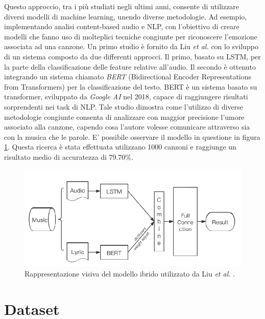 \documentclass[11pt]{report}
\begin{document}
 Questo approccio, tra i più studiati negli ultimi anni, consente di utilizzare diversi modelli di machine learning, unendo diverse metodologie. Ad esempio, implementando analisi content-based audio e NLP, con l'obiettivo di creare modelli che fanno uso di molteplici tecniche congiunte per riconoscere l'emozione associata ad una canzone. Un primo studio è fornito da Liu \textit{et al. }\cite{liu2020research} con lo sviluppo di un sistema composto da due differenti approcci. Il primo, basato su LSTM, per la parte della classificazione delle feature relative all'audio. Il secondo è ottenuto integrando un sistema chiamato \textit{BERT} (Bidirectional Encoder Representations from Transformers) \cite{devlin2018bert} per la classificazione del testo. BERT è un sistema basato su transformer, sviluppato da \textit{Google AI} nel 2018, capace di raggiungere risultati sorprendenti nei task di NLP. Tale studio dimostra come l'utilizzo di diverse metodologie congiunte consenta di analizzare con maggior precisione l'umore associato alla canzone, capendo cosa l'autore volesse comunicare attraverso sia con la musica che le parole.  E' possibile osservare il modello in questione in figura \ref{fig-liu}. Questa ricerca è stata effettuata utilizzano 1000 canzoni e raggiunge un risultato medio di accuratezza di 79.70\%.

\vspace{2cm}

\begin{figure}[h]
\centering
\includegraphics[scale = 0.5]{img/Liu_model.PNG}
\caption{Rappresentazione visiva del modello ibrido utilizzato da Liu \textit{et al.} \cite{liu2020research}.}
\label{fig-liu}
\end{figure}



\chapter{Dataset}
\end{document}
